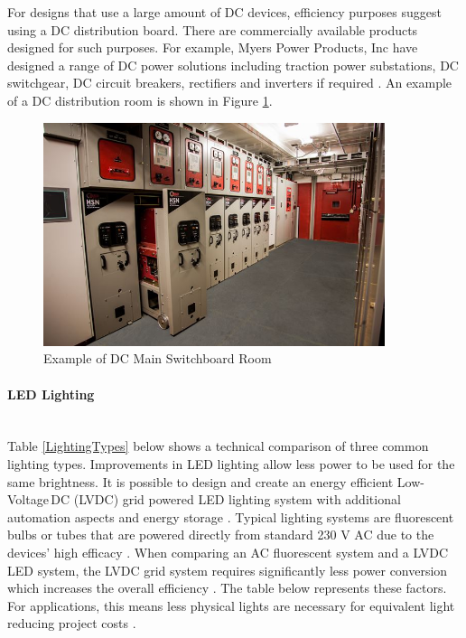 For designs that use a large amount of DC devices, efficiency purposes suggest using a DC distribution board. There are commercially available products designed for such purposes. For example, Myers Power Products, Inc have designed a range of DC power solutions including traction power substations, DC switchgear, DC circuit breakers, rectifiers and inverters if required \cite{website:Myers1}. An example of a DC distribution room is shown in Figure \ref{fig:dc-switchgear-room}.         

\begin{figure}[H]
	\hfill\includegraphics[width=100mm]{images/dc-switchgear}\hspace*{\fill}
	\caption{Example of DC Main Switchboard Room \cite{website:Myers1}} 
	\label{fig:dc-switchgear-room}
\end{figure}

\paragraph{LED Lighting}
~\\
Table \ref{LightingTypes} below shows a technical comparison of three common lighting types. Improvements in LED lighting allow less power to be used for the same brightness. It is possible to design and create an energy efficient Low-Voltage\,DC (LVDC) grid powered LED lighting system with additional automation aspects and energy storage \cite{Koh2011}. Typical lighting systems are fluorescent bulbs or tubes that are powered directly from standard 230 V AC due to the devices' high efficacy \cite{Koh2011}. When comparing an AC fluorescent system and a LVDC LED system, the LVDC grid system requires significantly less power conversion which increases the overall efficiency \cite{Koh2011}. The table below represents these factors. For applications, this means less physical lights are necessary for equivalent light reducing project costs \cite{website:LED}.  

